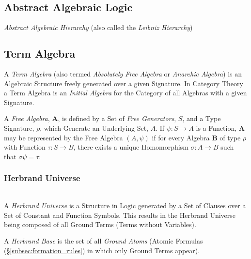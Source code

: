 \documentclass{article}
\begin{document}
\subsection{Abstract Algebraic Logic}

\emph{Abstract Algebraic Hierarchy} (also called the \emph{Leibniz Hierarchy})

\subsection{Term Algebra}\label{subsec:term_algebra}

A \emph{Term Algebra} (also termed \emph{Absolutely Free Algebra} or
\emph{Anarchic Algebra}) is an Algebraic Structure freely generated
over a given Signature. In Category Theory a Term Algebra is an
\emph{Initial Algebra} for the Category of all Algebras with a given
Signature.

A \emph{Free Algebra}, $\mathbf{A}$, is defined by a Set of \emph{Free
  Generators}, $S$, and a Type Signature, $\rho$, which Generate an
Underlying Set, $A$. If $\psi : S \rightarrow A$ is a Function,
$\mathbf{A}$ may be represented by the Free Algebra $(A,\psi)$ if for
every Algebra $\mathbf{B}$ of type $\rho$ with Function $\tau : S
\rightarrow B$, there exists a unique Homomorphism $\sigma : A
\rightarrow B$ such that $\sigma\psi = \tau$.

\subsubsection{Herbrand Universe}\label{subsec:herbrand_universe}
\hfill \\
A \emph{Herbrand Universe} is a Structure in Logic generated by a Set
of Clauses over a Set of Constant and Function Symbols. This results
in the Herbrand Universe being composed of all Ground Terms (Terms
without Variables).

A \emph{Herbrand Base} is the set of all \emph{Ground Atoms} (Atomic
Formulas (\S\ref{subsec:formation_rules}) in which only Ground Terms
appear).

\end{document}
